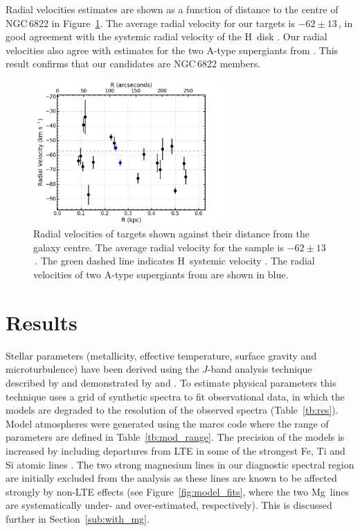 Radial velocities estimates are shown as a function of distance to the centre of NGC\,6822 in Figure~\ref{fig:RvsRV}.
The average radial velocity for our targets is $-62\pm13$\,\kms,
in good agreement with the systemic radial velocity of the H\,\1 disk
\citep[$-57\pm2$\,\kms;][]{2004AJ....128...16K}.
Our radial velocities also agree with estimates for the two A-type supergiants from
\cite{2001ApJ...547..765V}.
This result confirms that our candidates are NGC\,6822 members.

\begin{figure}
 \centering
\includegraphics[width=0.65\textwidth]{ngc6822/N6822_RvsRV-v2}
\caption[Radial velocities shown against distance from galaxy centre]{
Radial velocities of targets shown against their distance from the galaxy centre.
The average radial velocity for the sample is $-62\pm13$\,\kms.
The green dashed line indicates H\,\1 systemic velocity
\protect\citep[$-57\pm2$\,\kms;][]{2004AJ....128...16K}.
The radial velocities of two A-type supergiants from
\protect\cite{2001ApJ...547..765V} are shown in blue.
        }
\label{fig:RvsRV}
\end{figure}



\section{Results} %
\label{sec:results}

Stellar parameters
(metallicity, effective temperature, surface gravity and microturbulence)
have been derived using the $J$-band analysis technique described by
\cite{2010MNRAS.407.1203D} and demonstrated by
\cite{2014ApJ...788...58G} and
\cite{2015ApJ...806...21D}.
To estimate physical parameters this technique uses a grid of synthetic spectra to fit observational data,
in which the models are degraded to the resolution of the observed spectra
(Table~\ref{tb:res}).
Model atmospheres were generated using the {\sc marcs} code
{\citep{2008A&A...486..951G}} where the range of parameters are defined in
Table~\ref{tb:mod_range}.
The precision of the models is increased by including departures from LTE in some of the strongest Fe, Ti and Si atomic lines
\citep{2012ApJ...751..156B,2013ApJ...764..115B}.
The two strong magnesium lines in our diagnostic spectral region are initially excluded from the analysis as these lines are known to be affected strongly by non-LTE effects
(see Figure~\ref{fig:model_fits}, where the two Mg\,\1 lines are systematically under- and over-estimated, respectively).
This is discussed further in Section~\ref{sub:with_mg}.


